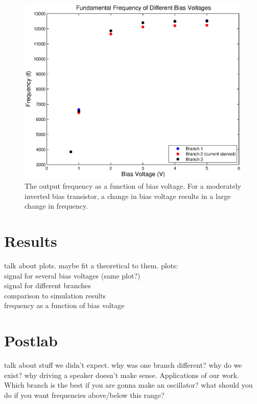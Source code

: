\documentclass{article}
\begin{document}
\begin{figure}[H]
\centering
\includegraphics[scale=.7]{biasFrequenciesSim.eps}
\caption{The output frequency as a function of bias voltage. For a moderately inverted bias transistor, a change in bias voltage results in a large change in frequency.}
\label{biasFrequenciesSim}
\end{figure}

\section{Results}
talk about plots. maybe fit a theoretical to them.
plots:\\
signal for several bias voltages (same plot?)\\
signal for different branches\\
comparison to simulation results\\
frequency as a function of bias voltage\
\section{Postlab}
talk about stuff we didn't expect. why was one branch different? why do we exist? why driving a speaker doesn't make sense. Applications of our work. Which branch is the best if you are gonna make an oscillator? what should you do if you want frequencies above/below this range?
\end{document}
